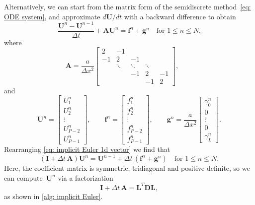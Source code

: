 Alternatively, we can start from the matrix form of the semidiscrete 
method~\eqref{eq: ODE system}, and approximate $d\boldsymbol{U}/dt$ with a 
backward difference to obtain
\begin{equation}\label{eq: implicit Euler 1d vector}
\frac{\boldsymbol{U}^n-\boldsymbol{U}^{n-1}}{\Delta t}
	+\boldsymbol{A}\boldsymbol{U}^n=\boldsymbol{f}^n+\boldsymbol{g}^n
\quad\text{for $1\le n\le N$,}
\end{equation}
where
\[
\boldsymbol{A}=\frac{a}{\Delta x^2}\begin{bmatrix}
 2&    -1&      &      &\\
-1&     2&    -1&      &\\
  &\ddots&\ddots&\ddots&\\
  &      &    -1&     2&-1\\
  &      &      &    -1& 2\end{bmatrix},\qquad
\]
and
\[
\boldsymbol{U}^n=\begin{bmatrix}
U^n_1\\ U^n_2\\ \vdots\\ U^n_{P-2}\\ U^n_{P-1}\end{bmatrix},\qquad
\boldsymbol{f}^n=\begin{bmatrix}
f^n_1\\ f^n_2\\ \vdots\\ f^n_{P-2}\\ f^n_{P-1}\end{bmatrix},\qquad
\boldsymbol{g}^n=\frac{a}{\Delta x^2}\begin{bmatrix}
\gamma_0^n\\ 0\\ \vdots\\ 0\\ \gamma_L^n\end{bmatrix}.
\]
Rearranging \eqref{eq: implicit Euler 1d vector} we find that
\[
(\boldsymbol{I}+\Delta t\,\boldsymbol{A})\boldsymbol{U}^n
	=\boldsymbol{U}^{n-1}+\Delta t\,(\boldsymbol{f}^n+\boldsymbol{g}^n)
\quad\text{for $1\le n\le N$.}
\]
Here, the coefficient matrix is symmetric, tridiagonal and positive-definite, 
so we can compute~$\boldsymbol{U}^n$ via a factorization
\[
\boldsymbol{I}+\Delta t\,\boldsymbol{A}
	=\boldsymbol{L}^T\boldsymbol{D}\boldsymbol{L},
\]
as shown in \cref{alg: implicit Euler}.

